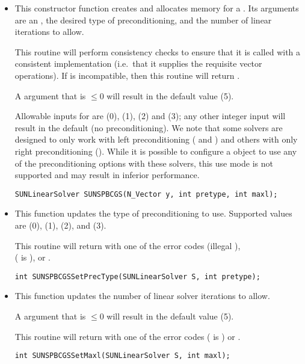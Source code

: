\begin{itemize}


\item {}

  This constructor function creates and allocates memory for a {\spbcg}
  .  Its arguments are an {\nvector}, the desired
  type of preconditioning, and the number of linear iterations to allow.

  This routine will perform consistency checks to ensure that it is
  called with a consistent {\nvector} implementation (i.e.~that it
  supplies the requisite vector operations).  If  is
  incompatible, then this routine will return .

  A  argument that is $\le0$ will result in the default
  value (5).

  Allowable inputs for  are  (0),
   (1),  (2) and  (3);
  any other integer input will result in the default (no
  preconditioning).
  We note that some {\sundials} solvers are designed to only work
  with left preconditioning ({\ida} and {\idas}) and others with only
  right preconditioning ({\kinsol}). While it is possible to configure
  a {\sunlinsolspbcgs} object to use any of the preconditioning options
  with these solvers, this use mode is not supported and may result in
  inferior performance.

  \verb|SUNLinearSolver SUNSPBCGS(N_Vector y, int pretype, int maxl);|


\item {}

  This function updates the type of preconditioning to use.  Supported
  values are  (0),  (1),
   (2), and  (3).  

  This routine will return with one of the error codes
   (illegal ), \\ \noindent
    ( is ), or .
  
  \verb|int SUNSPBCGSSetPrecType(SUNLinearSolver S, int pretype);|


\item {}

  This function updates the number of linear solver iterations to allow.  

  A  argument that is $\le0$ will result in the default
  value (5).

  This routine will return with one of the error codes
   ( is ) or .
  
  \verb|int SUNSPBCGSSetMaxl(SUNLinearSolver S, int maxl);|

\end{itemize}
